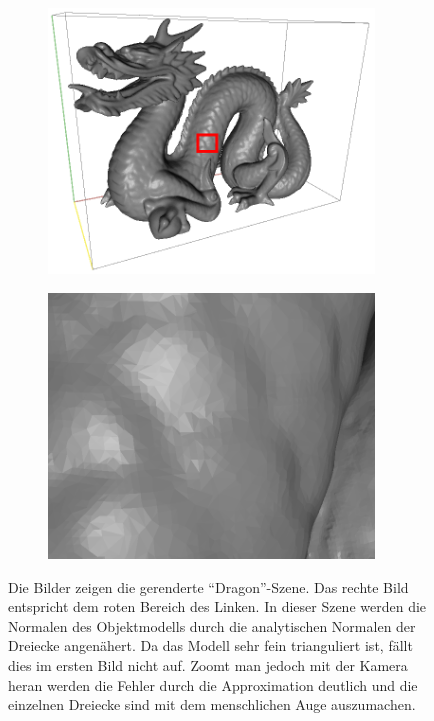 		\begin{figure}[h]
			\begin{subfigure}[b]{0.5\textwidth}
				\center
				\includegraphics[width=0.95\textwidth]{pic/normal_facette-mark.png}
			\end{subfigure}
			\begin{subfigure}[b]{0.5\textwidth}
				\center
				\includegraphics[width=0.95\textwidth]{pic/normal_facette-zoom.png}
			\end{subfigure}
			\caption[Facetten-Muster der \enquote{Dragon}-Szene ohne Shading-Normale]{Die Bilder zeigen die gerenderte \enquote{Dragon}-Szene. Das rechte Bild entspricht dem roten Bereich des Linken. In dieser Szene werden die Normalen des Objektmodells durch die analytischen Normalen der Dreiecke angenähert. Da das Modell sehr fein trianguliert ist, fällt dies im ersten Bild nicht auf. Zoomt man jedoch mit der Kamera heran werden die Fehler durch die Approximation deutlich und die einzelnen Dreiecke sind mit dem menschlichen Auge auszumachen.}
			\label{fig:facette}
		\end{figure}

